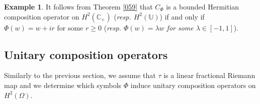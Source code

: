 \documentclass[11pt]{amsart}%
\theoremstyle{definition}
\newtheorem{exm}[thm]{Example}
\theoremstyle{remark}
\numberwithin{equation}{section}
\begin{document}
\begin{exm}
It follows from Theorem \ref{059} that $C_{\Phi}$ is a bounded Hermitian composition operator on
$H^{2}(\mathbb{C}_{+})$ ({\it resp. $H^{2}(\mathbb{U})$}) if and only if $\Phi(w)=w+ir$ for some $r\geq0$ ({\it resp. $\Phi(w)=\lambda w$ for some
$\lambda\in[-1,1]$}).
\end{exm}




\subsection{Unitary composition operators}

Similarly to the previous section, we assume that $\tau$ is a 
linear fractional Riemann map and
we determine which symbols $\Phi$ induce unitary composition operators on $H^2(\Omega).$
\end{document}
